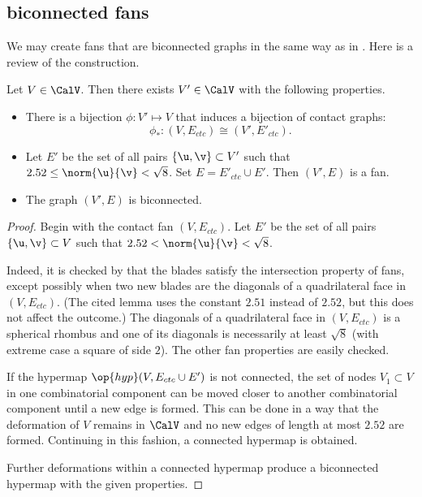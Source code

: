 \subsection{biconnected fans}

We may create  fans that are biconnected graphs in the same way as in
\cite{Hales:2006:DCG}.  Here is a review
of the construction.



\begin{lemma}\label{lemma:V'-bi} 
Let $V\in \CalV$.  Then there exists $V'\in \CalV$ with
  the following properties.
\begin{itemize}
\item There is a bijection $\phi:V'\mapsto V$ that induces a bijection
  of contact graphs:
\[
\phi_*:(V,E_{ctc}) \cong (V',E'_{ctc}).
\]
\item Let $E'$ be the set of all pairs $\{\u,\v\}\subset V'$
  such that $2.52\le\norm{\u}{\v} <\sqrt8$.  Set $E =
  E'_{ctc}\cup E'$.  Then $(V',E)$ is a fan.
\item The graph $(V',E)$ is biconnected.
\end{itemize}
\end{lemma}

\begin{proof}
  Begin with the contact fan $(V,E_{ctc})$.  Let $E'$ be the set
  of all pairs $\{\u,\v\}\subset V$ such that
  $2.52<\norm{\u}{\v}<\sqrt8$.

   Indeed, it is checked by
  \cite[Lemma~4.30]{Hales:2006:DCG} that the blades satisfy the
  intersection property of fans, except possibly when two new blades
  are the diagonals of a quadrilateral face in $(V,E_{ctc})$.  (The
  cited lemma uses the constant $2.51$ instead of $2.52$, but this
  does not affect the outcome.)  The diagonals of a quadrilateral face
  in $(V,E_{ctc})$ is a spherical rhombus and one of its diagonals is
  necessarily at least $\sqrt8$ (with extreme case a square of side
  $2$).  The other fan properties are easily checked.

  If the hypermap $\op{hyp}(V,E_{ctc}\cup E')$ is not connected,
  the set of nodes $V_1\subset V$ in one combinatorial component can
  be moved closer to another combinatorial component until a new edge
  is formed.  This can be done in a way that the deformation of $V$
  remains in $\CalV$ and no new edges of length at most $2.52$ are formed.
  Continuing in this fashion, a connected hypermap is obtained.

  Further deformations within a connected hypermap produce a
  biconnected hypermap with the given properties.
\end{proof}


